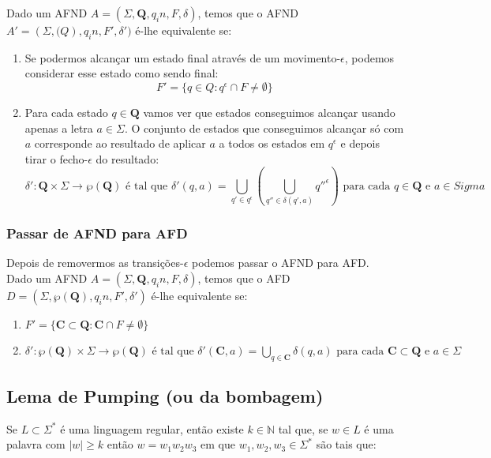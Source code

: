 \documentclass{article}
\begin{document}
Dado um AFND $A = (\Sigma, \mathbf{Q}, q_in, F, \delta)$, temos que o AFND $A' = (\Sigma, \mathbf(Q), q_in, F', \delta')$ é-lhe equivalente se:

\begin{enumerate}
    \item Se podermos alcançar um estado final através de um movimento-$\epsilon$, podemos considerar esse estado como sendo final: $$ F' = \{q \in Q : q^\epsilon \cap F \neq \emptyset\} $$
    \item Para cada estado $q \in \mathbf{Q}$ vamos ver que estados conseguimos alcançar usando apenas a letra $a \in \Sigma$. O conjunto de estados que conseguimos alcançar só com $a$ corresponde ao resultado de aplicar $a$ a todos os estados em $q^\epsilon$ e depois tirar o fecho-$\epsilon$ do resultado: $$ \delta' : \mathbf{Q} \times \Sigma \to \wp(\mathbf{Q}) \text{ é tal que } \delta'(q,a) = \bigcup_{q' \in q^\epsilon}(\bigcup_{q'' \in \delta(q', a)}q''^\epsilon) \text{ para cada } q \in \mathbf{Q} \text{ e } a \in Sigma $$
\end{enumerate}

\subsubsection{Passar de AFND para AFD}

Depois de removermos as transições-$\epsilon$ podemos passar o AFND para AFD. \\
Dado um AFND $A = (\Sigma, \mathbf{Q}, q_in, F, \delta)$, temos que o AFD $D = (\Sigma, \wp(\mathbf{Q}), q_in, F', \delta')$ é-lhe equivalente se:

\begin{enumerate}
    \item $F' = \{\mathbf{C} \subset \mathbf{Q} : \mathbf{C} \cap F \neq \emptyset\}$
    \item $\delta' : \wp(\mathbf{Q}) \times \Sigma \to \wp(\mathbf{Q}) \text{ é tal que } \delta'(\mathbf{C}, a) = \bigcup_{q \in \mathbf{C}}\delta(q,a) \text{ para cada } \mathbf{C} \subset \mathbf{Q} \text{ e } a \in \Sigma$
\end{enumerate}

\subsection{Lema de Pumping (ou da bombagem)}

Se $L \subset \Sigma^*$ é uma linguagem regular, então existe $k \in \mathbb{N}$ tal que, se $w \in L$ é uma palavra com $|w| \geq k$ então $w = w_1w_2w_3$ em que $w_1,w_2,w_3 \in \Sigma^*$ são tais que:
\end{document}
